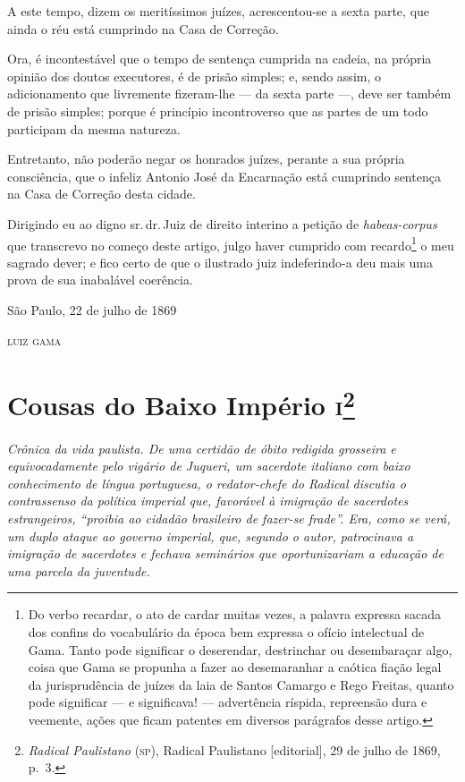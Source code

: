 A este tempo, dizem os meritíssimos juízes, acrescentou-se a sexta
parte, que ainda o réu está cumprindo na Casa de Correção.

Ora, é incontestável que o tempo de sentença cumprida na cadeia, na
própria opinião dos doutos executores, é de prisão simples; e, sendo
assim, o adicionamento que livremente fizeram-lhe --- da sexta parte ---,
deve ser também de prisão simples; porque é princípio incontroverso que
as partes de um todo participam da mesma natureza.

Entretanto, não poderão negar os honrados juízes, perante a sua própria
consciência, que o infeliz Antonio José da Encarnação está cumprindo
sentença na Casa de Correção desta cidade.

Dirigindo eu ao digno sr.\,dr.\,Juiz de direito interino a petição de
\emph{habeas-corpus} que transcrevo no começo deste artigo, julgo haver
cumprido com recardo\footnote{Do verbo recardar, o ato de cardar
  muitas vezes, a palavra expressa sacada dos confins do vocabulário da
  época bem expressa o ofício intelectual de Gama. Tanto pode significar
  o deserendar, destrinchar ou desembaraçar algo, coisa que Gama se
  propunha a fazer ao desemaranhar a caótica fiação legal da
  jurisprudência de juízes da laia de Santos Camargo e Rego Freitas,
  quanto pode significar --- e significava! --- advertência ríspida,
  repreensão dura e veemente, ações que ficam patentes em diversos
  parágrafos desse artigo.} o meu sagrado dever; e fico certo de que o
ilustrado juiz indeferindo-a deu mais uma prova de sua inabalável
coerência.

\begin{flushright}
São Paulo, 22 de julho de 1869

\textsc{luiz gama}
\end{flushright}

\chapter{Cousas do Baixo Império \textsc{i}\footnote{\emph{Radical
  Paulistano} (\textsc{sp}), Radical Paulistano {[}editorial{]}, 29 de julho de 1869,
  p.~3.}}

\begin{didascalia}\itshape
Crônica da vida paulista. De uma certidão de óbito redigida grosseira e
equivocadamente pelo vigário de Juqueri, um sacerdote italiano com baixo
conhecimento de língua portuguesa, o redator-chefe do \textnormal{Radical}
discutia o contrassenso da política imperial que, favorável à
imigração de sacerdotes estrangeiros, ``proibia ao cidadão
brasileiro de fazer-se frade''. Era, como se verá, um duplo ataque ao
governo imperial, que, segundo o autor, patrocinava a imigração de
sacerdotes e fechava seminários que oportunizariam a educação de uma
parcela da juventude.
\end{didascalia}



